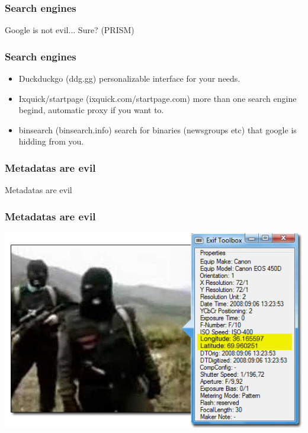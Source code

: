 \begin{frame}
\frametitle{Search engines}
\begin{center}
\huge{Google is not evil... Sure? (PRISM)}
\end{center}
\end{frame}

\begin{frame}
\frametitle{Search engines}
\begin{itemize}
\item Duckduckgo (ddg.gg) personalizable interface for your needs.
\item Ixquick/startpage (ixquick.com/startpage.com) more than one search engine
begind, automatic proxy if you want to.
\item binsearch (binsearch.info) search for binaries (newsgroups etc) that
google is hidding from you.
\end{itemize}
\end{frame}

\begin{frame}
\frametitle{Metadatas are evil}
\begin{center}
\huge{Metadatas are evil}
\end{center}
\end{frame}

\begin{frame}
\frametitle{Metadatas are evil}
\begin{center}
\includegraphics[scale=0.5] {./materials/exif-metadata.jpg} 
\end{center}
\end{frame}

